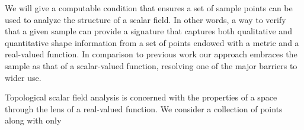 
We will give a computable condition that ensures a set of sample points can be used to analyze the structure of a scalar field.
In other words, a way to verify that a given sample can provide a signature that captures both qualitative and quantitative shape information from a set of points endowed with a metric and a real-valued function.
In comparison to previous work our approach embraces the sample as that of a scalar-valued function, resolving one of the major barriers to wider use.

Topological scalar field analysis is concerned with the properties of a space through the lens of a real-valued function.
We consider a collection of points along with only
